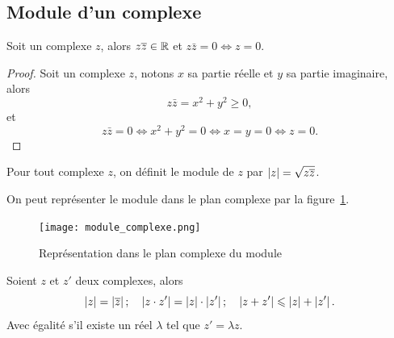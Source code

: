 \subsection{Module d'un complexe}
\label{subsec:modulecomplexe}
\begin{prop}
    Soit un complexe \(z\), alors \(z \overline{z} \in \mathbb{R}\) et \(z \bar{z}=0 \iff z = 
    0\).
\end{prop}
\begin{proof}
    Soit un complexe \(z\), notons \(x\) sa partie réelle et \(y\) sa partie 
    imaginaire, alors
    \begin{equation}
        z \bar{z}=x^2+y^2 \geqslant 0,
    \end{equation}
    et
    \begin{equation}
        z \bar{z}=0 \iff x^2+y^2=0 \iff x=y=0 \iff z=0.
    \end{equation}
\end{proof}
\begin{defdef}
    Pour tout complexe \(z\), on définit le module de \(z\) par 
    \(\left\lvert z\right\rvert=\sqrt{z \overline{z}}\).
\end{defdef}
On peut représenter le module dans le plan complexe par la 
figure~\ref{fig:moduleComplexe}.
\begin{figure}
    \centering
    \texttt{[image: module\_complexe.png]}
    \caption{Représentation dans le plan complexe du module}
    \label{fig:moduleComplexe}
\end{figure}
\begin{prop}
    Soient \(z\) et \(z'\) deux complexes, alors
    \begin{equation}
        \left\lvert z\right\rvert=\left\lvert\overline{z}\right\rvert; \quad \left\lvert z \cdot z'\right\rvert=\left\lvert z\right\rvert \cdot \left\lvert z'\right\rvert; 
        \quad \left\lvert z+z'\right\rvert\leqslant\left\lvert z\right\rvert+\left\lvert z'\right\rvert.
    \end{equation}
    Avec égalité s'il existe un réel \(\lambda\) tel que \(z'=\lambda z\).
\end{prop}
